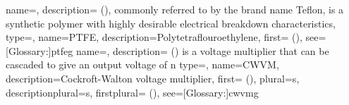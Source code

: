 {
    name={},
    description={ (), commonly referred to by the brand name Teflon, is a synthetic polymer with highly desirable electrical breakdown characteristics},
}
{
    type=\acronymtype,
    name={PTFE},
    description={Polytetraflouroethylene},
    first={ ()},
    see=[Glossary:]{ptfeg}
}
{
    name={},
    description={ () is a voltage multiplier that can be cascaded to give an output voltage of \SI{n}{\vpp}}
}
{
    type=\acronymtype,
    name={CWVM},
    description={Cockroft-Walton voltage multiplier},
    first={ ()},
    plural={s},
    descriptionplural={s},
    firstplural={ ()},
    see=[Glossary:]{cwvmg}
}
